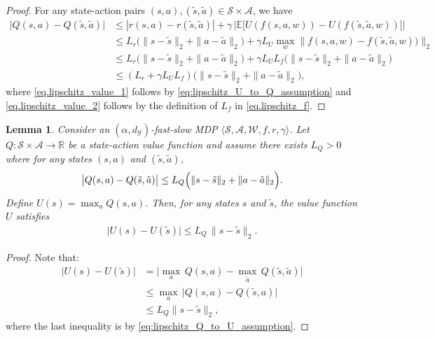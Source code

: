 \documentclass[11pt, notitlepage]{article}
\newcommand{\E}{\mathbb{E}}
\newcommand{\R}{\mathbb{R}}
\newcommand{\1}{\mathbbm{1}}
\newtheorem{lemma}{Lemma}[section]
\begin{document}
\begin{proof}
    For any state-action pairs $(s,a),(\tilde{s},\tilde{a}) \in \mathcal S \times \mathcal A$, we have
    \begin{align}
        \bigl| Q(s,a) - Q(\tilde{s},\tilde{a}) \bigr| %
        &\leq | r(s,a) - r(\tilde{s},\tilde{a})| + \gamma \, \bigl| \E\bigl[U(f(s,a,w)) - U(f(\tilde{s},\tilde{a}, w))\bigr] \bigr| \nonumber\\
        &\leq L_r \bigl(\|s-\tilde{s}\|_2 + \|a-\tilde{a}\|_2\bigr) + \gamma L_U \max_{w} \bigl\|f(s,a, w) - f(\tilde{s},\tilde{a}, w))\bigr\|_2  \label{eq.lipschitz_value_1}\\
        &\leq L_r \bigl(\|s-\tilde{s}\|_2 +\|a-\tilde{a}\|_2\bigr) + \gamma L_U L_f \bigl( \|s - \tilde{s}\|_2 + \|a-\tilde{a}\|_2\bigr)  \label{eq.lipschitz_value_2}\\
        &\leq (L_r + \gamma L_U L_f) \bigl( \|s-\tilde{s}\|_2 + \|a-\tilde{a}\|_2\bigr), \nonumber
    \end{align}
    where \eqref{eq.lipschitz_value_1} follows by \eqref{eq:lipschitz_U_to_Q_assumption} and \eqref{eq.lipschitz_value_2} follows by the definition of $L_f$ in \eqref{eq.lipschitz_f}.
\end{proof}



\begin{lemma} \label{lemma.lipschitz_Q_to_U}
    Consider an $(\alpha, d_\mathcal{Y})$-fast-slow MDP $\langle \mathcal{S}, \mathcal{A}, \mathcal{W}, f, r, \gamma \rangle$. Let $Q:\mathcal{S} \times \mathcal A \rightarrow \R$ be a state-action value function and assume there exists $L_Q > 0$ where for any states $(s, a)$ and $(\tilde{s}, \tilde{a})$,
    \begin{align}
        \bigl| Q(s,a) - Q(\tilde{s},\tilde{a}) \bigr|
        \leq L_Q \Bigl(\|s-\tilde{s}\|_2 +\|a-\tilde{a}\|_2 \Bigr).
        \label{eq:lipschitz_Q_to_U_assumption}
    \end{align}
    Define $U(s) = \max_a Q(s,a)$. Then, for any states $s$ and $\tilde{s}$, the value function $U$ satisfies
    \begin{align*}
        \bigl| U(s) - U(\tilde{s}) \bigr|
        \leq L_Q \, \|s-\tilde{s}\|_2.
    \end{align*}
\end{lemma}

\begin{proof}
Note that:
    \begin{align*}
        \bigl| U(s) - U(\tilde{s}) \bigr| &= \bigl| \max_a \, Q(s,a) - \max_{\tilde{a}}\, Q(\tilde{s},\tilde{a}) \bigr| \\
        &\leq \max_a \, \bigl| Q(s,a) - Q(\tilde{s},a) \bigr| \\
        &\leq L_Q \|s-\tilde{s}\|_2,
    \end{align*}
    where the last inequality is by \eqref{eq:lipschitz_Q_to_U_assumption}.
\end{proof}
\end{document}
